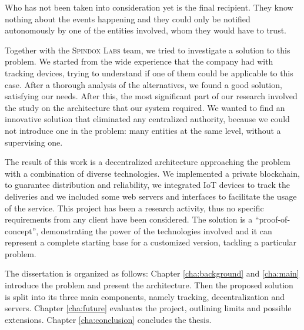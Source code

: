 Who has not been taken into consideration yet is the final recipient. They know nothing about the events happening and they could only be notified autonomously by one of the entities involved, whom they would have to trust. 

Together with the \textsc{Spindox Labs} team, we tried to investigate a solution to this problem. We started from the wide experience that the company had with tracking devices, trying to understand if one of them could be applicable to this case. After a thorough analysis of the alternatives, we found a good solution, satisfying our needs. After this, the most significant part of our research involved the study on the architecture that our system required. We wanted to find an innovative solution that eliminated any centralized authority, because we could not introduce one in the problem: many entities at the same level, without a supervising one. 

The result of this work is a decentralized architecture approaching the problem with a combination of diverse technologies. We implemented a private blockchain, to guarantee distribution and reliability, we integrated IoT devices to track the deliveries and we included some web servers and interfaces to facilitate the usage of the service. This project has been a research activity, thus no specific requirements from any client have been considered. The solution is a ``proof-of-concept'', demonstrating the power of the technologies involved and it can represent a complete starting base for a customized version, tackling a particular problem.

The dissertation is organized as follows: Chapter \ref{cha:background} and \ref{cha:main} introduce the problem and present the architecture. Then the proposed solution is split into its three main components, namely tracking, decentralization and servers. Chapter \ref{cha:future} evaluates the project, outlining limits and possible extensions. Chapter \ref{cha:conclusion} concludes the thesis.


\newpage